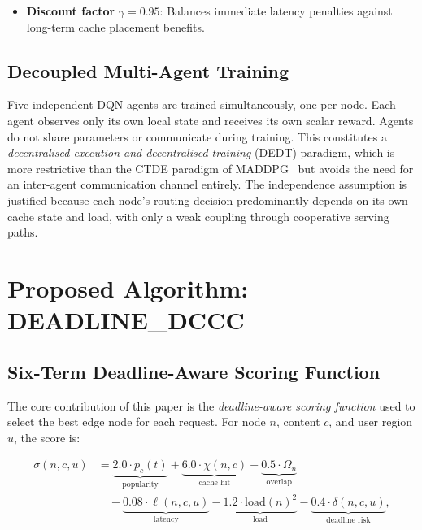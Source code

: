 \documentclass[conference]{IEEEtran}
\begin{document}
\begin{itemize}
  \item \textbf{Discount factor} $\gamma = 0.95$: Balances immediate
    latency penalties against long-term cache placement benefits.
\end{itemize}

\subsection{Decoupled Multi-Agent Training}

Five independent DQN agents are trained simultaneously, one per node.
Each agent observes only its own local state and receives its own
scalar reward.  Agents do not share parameters or communicate during
training.  This constitutes a \emph{decentralised execution and
decentralised training} (DEDT) paradigm, which is more restrictive than
the CTDE paradigm of MADDPG~\cite{lowe2017multi} but avoids the need
for an inter-agent communication channel entirely.  The independence
assumption is justified because each node's routing decision
predominantly depends on its own cache state and load, with only a weak
coupling through cooperative serving paths.

\section{Proposed Algorithm: DEADLINE\_DCCC}
\label{sec:algorithm}

\subsection{Six-Term Deadline-Aware Scoring Function}

The core contribution of this paper is the \emph{deadline-aware
scoring function} used to select the best edge node for each request.
For node $n$, content $c$, and user region $u$, the score is:

\begin{align}
  \sigma(n, c, u) &=
    \underbrace{2.0 \cdot p_c(t)}_{\text{popularity}}
    + \underbrace{6.0 \cdot \chi(n, c)}_{\text{cache hit}}
    - \underbrace{0.5 \cdot \Omega_n}_{\text{overlap}} \nonumber \\
    &\quad
    - \underbrace{0.08 \cdot \ell(n,c,u)}_{\text{latency}}
    - \underbrace{1.2 \cdot \mathrm{load}(n)^2}_{\text{load}}
    - \underbrace{0.4 \cdot \delta(n,c,u)}_{\text{deadline risk}},
  \label{eq:score}
\end{align}
\end{document}

